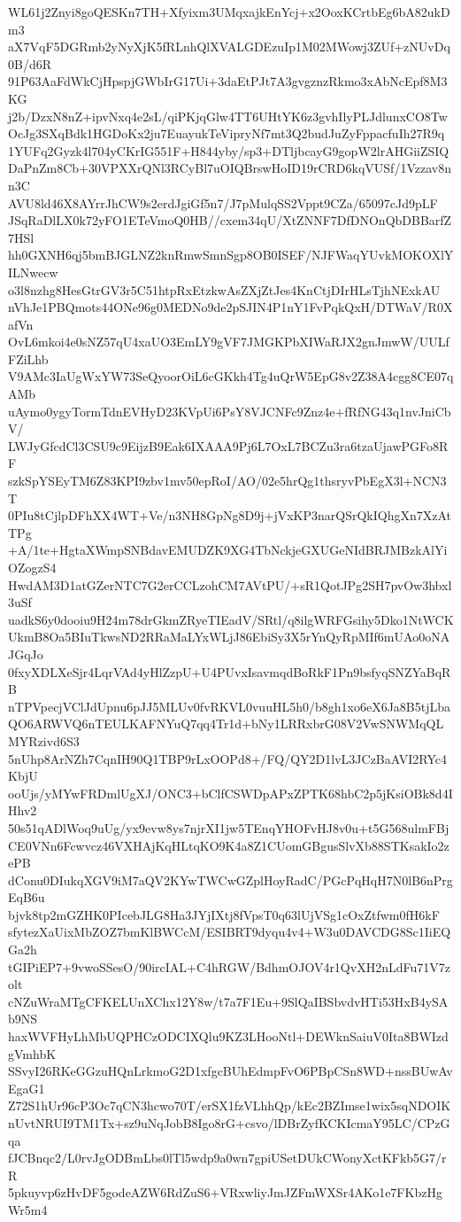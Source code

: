 WL61j2Znyi8goQESKn7TH+Xfyixm3UMqxajkEnYcj+x2OoxKCrtbEg6bA82ukDm3
aX7VqF5DGRmb2yNyXjK5fRLnhQlXVALGDEzuIp1M02MWowj3ZUf+zNUvDq0B/d6R
91P63AaFdWkCjHpspjGWbIrG17Ui+3daEtPJt7A3gvgznzRkmo3xAbNcEpf8M3KG
j2b/DzxN8nZ+ipvNxq4e2sL/qiPKjqGlw4TT6UHtYK6z3gvhIlyPLJdlunxCO8Tw
OcJg3SXqBdk1HGDoKx2ju7EuayukTeVipryNf7mt3Q2budJuZyFppacfuIh27R9q
1YUFq2Gyzk4l704yCKrIG551F+H844yby/sp3+DTljbcayG9gopW2lrAHGiiZSIQ
DaPnZm8Cb+30VPXXrQNl3RCyBl7uOIQBrswHoID19rCRD6kqVUSf/1Vzzav8nn3C
AVU8ld46X8AYrrJhCW9s2erdJgiGf5n7/J7pMulqSS2Vppt9CZa/65097cJd9pLF
JSqRaDlLX0k72yFO1ETeVmoQ0HB//cxem34qU/XtZNNF7DfDNOnQbDBBarfZ7HSl
hh0GXNH6qj5bmBJGLNZ2knRmwSmnSgp8OB0ISEF/NJFWaqYUvkMOKOXlYILNwecw
o3l8nzhg8HesGtrGV3r5C51htpRxEtzkwAsZXjZtJes4KnCtjDIrHLsTjhNExkAU
nVhJe1PBQmots44ONe96g0MEDNo9de2pSJIN4P1nY1FvPqkQxH/DTWaV/R0XafVn
OvL6mkoi4e0sNZ57qU4xaUO3EmLY9gVF7JMGKPbXIWaRJX2gnJmwW/UULfFZiLhb
V9AMc3IaUgWxYW73SeQyoorOiL6cGKkh4Tg4uQrW5EpG8v2Z38A4cgg8CE07qAMb
uAymo0ygyTormTdnEVHyD23KVpUi6PsY8VJCNFc9Znz4e+fRfNG43q1nvJniCbV/
LWJyGfcdCl3CSU9c9EijzB9Eak6IXAAA9Pj6L7OxL7BCZu3ra6tzaUjawPGFo8RF
szkSpYSEyTM6Z83KPI9zbv1mv50epRoI/AO/02e5hrQg1thsryvPbEgX3l+NCN3T
0PIu8tCjlpDFhXX4WT+Ve/n3NH8GpNg8D9j+jVxKP3narQSrQkIQhgXn7XzAtTPg
+A/1te+HgtaXWmpSNBdavEMUDZK9XG4TbNckjeGXUGeNIdBRJMBzkAlYiOZogzS4
HwdAM3D1atGZerNTC7G2erCCLzohCM7AVtPU/+sR1QotJPg2SH7pvOw3hbxl3uSf
uadkS6y0dooiu9H24m78drGkmZRyeTIEadV/SRtl/q8ilgWRFGsihy5Dko1NtWCK
UkmB8Oa5BIuTkwsND2RRaMaLYxWLjJ86EbiSy3X5rYnQyRpMIf6mUAo0oNAJGqJo
0fxyXDLXeSjr4LqrVAd4yHlZzpU+U4PUvxIsavmqdBoRkF1Pn9bsfyqSNZYaBqRB
nTPVpecjVClJdUpnu6pJJ5MLUv0fvRKVL0vuuHL5h0/b8gh1xo6eX6Ja8B5tjLba
QO6ARWVQ6nTEULKAFNYuQ7qq4Tr1d+bNy1LRRxbrG08V2VwSNWMqQLMYRzivd6S3
5nUhp8ArNZh7CqnIH90Q1TBP9rLxOOPd8+/FQ/QY2D1lvL3JCzBaAVI2RYc4KbjU
ooUjs/yMYwFRDmlUgXJ/ONC3+bClfCSWDpAPxZPTK68hbC2p5jKsiOBk8d4IHhv2
50s51qADlWoq9uUg/yx9evw8ys7njrXI1jw5TEnqYHOFvHJ8v0u+t5G568ulmFBj
CE0VNn6Fcwvcz46VXHAjKqHLtqKO9K4a8Z1CUomGBgusSlvXb88STKsakIo2zePB
dConu0DIukqXGV9iM7aQV2KYwTWCwGZplHoyRadC/PGcPqHqH7N0lB6nPrgEqB6u
bjvk8tp2mGZHK0PIcebJLG8Ha3JYjIXtj8fVpsT0q63lUjVSg1cOxZtfwm0fH6kF
sfytezXaUixMbZOZ7bmKlBWCcM/ESIBRT9dyqu4v4+W3u0DAVCDG8Sc1IiEQGa2h
tGIPiEP7+9vwoSSesO/90ircIAL+C4hRGW/BdhmOJOV4r1QvXH2nLdFu71V7zolt
cNZuWraMTgCFKELUnXChx12Y8w/t7a7F1Eu+9SlQaIBSbvdvHTi53HxB4ySAb9NS
haxWVFHyLhMbUQPHCzODCIXQlu9KZ3LHooNtl+DEWknSaiuV0Ita8BWIzdgVmhbK
SSvyI26RKeGGzuHQnLrkmoG2D1xfgcBUhEdmpFvO6PBpCSn8WD+nssBUwAvEgaG1
Z72S1hUr96cP3Oc7qCN3hcwo70T/erSX1fzVLhhQp/kEc2BZImse1wix5sqNDOIK
nUvtNRUI9TM1Tx+sz9uNqJobB8Igo8rG+csvo/lDBrZyfKCKIcmaY95LC/CPzGqa
fJCBnqc2/L0rvJgODBmLbs0lTl5wdp9a0wn7gpiUSetDUkCWonyXctKFkb5G7/rR
5pkuyvp6zHvDF5godeAZW6RdZuS6+VRxwliyJmJZFmWXSr4AKo1e7FKbzHgWr5m4
